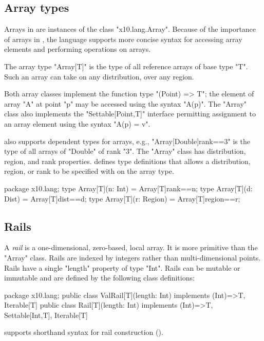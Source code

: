 \subsection{Array types}
\label{ArrayTypeConstructors}

Arrays in \Xten{} are instances of the class
\xcd"x10.lang.Array".
Because of the importance of arrays in \Xten{}, the language
supports more concise syntax for accessing array elements and
performing operations on arrays.


The array type \xcd"Array[T]" is the type of all
reference arrays of base type \xcd"T". Such an array can take on any
distribution, over any region. 


Both array classes implement the function type
\xcd"(Point) => T"; the element of array \xcd"A" at point
\xcd"p" may be accessed using the 
syntax \xcd"A(p)".  The \xcd"Array" class 
also implements the \xcd"Settable[Point,T]" interface 
permitting assignment to an array element using the syntax
\xcd"A(p) = v".

\Xten{} also supports dependent types for arrays,
e.g.,
\xcd"Array[Double]{rank==3}" is the type of all arrays of 
\xcd"Double" of rank \xcd"3".
The \xcd"Array" class has distribution, region, and rank
properties. 
\XtenCurrVer{} defines type definitions that
allows a distribution, region, or rank to be specified 
with on the array type.

\begin{xten}
package x10.lang;
type Array[T](n: Int) = Array[T]{rank==n};
type Array[T](d: Dist) = Array[T]{dist==d};
type Array[T](r: Region) = Array[T]{region==r};
\end{xten}

\subsection{Rails}

A \emph{rail} is a one-dimensional, zero-based, local array. 
It is more primitive than the \xcd"Array" class.
Rails are indexed by integers rather than multi-dimensional
points.  Rails have a single \xcd"length" property of type
\xcd"Int".  Rails can be mutable or immutable and are defined
by the following class definitions:

\begin{xten}
package x10.lang;
public class ValRail[T](length: Int) implements (Int)=>T, Iterable[T] { }
public class Rail[T](length: Int) implements (Int)=>T, Settable[Int,T], Iterable[T] { }
\end{xten}

\Xten{} supports shorthand syntax for rail construction
().

